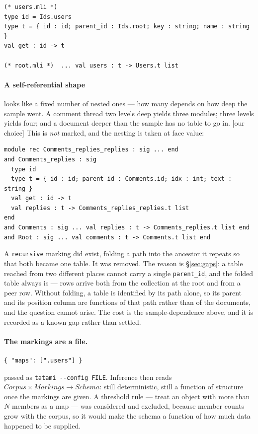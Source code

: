 \documentclass[11pt,a4paper]{article}
\newcommand{\ourcall}{\textcolor{ours}{\textsf{[our choice]}}}
\begin{document}
\begin{lstlisting}[style=ml]
(* users.mli *)
type id = Ids.users
type t = { id : id; parent_id : Ids.root; key : string; name : string }
val get : id -> t

(* root.mli *)  ... val users : t -> Users.t list
\end{lstlisting}

\paragraph{A self-referential shape} looks like a fixed number of nested ones
--- how many depends on how deep the sample went. A comment thread two levels
deep yields three modules; three levels yields four; and a document deeper
than the sample has no table to go in. \ourcall{} This is \emph{not} marked,
and the nesting is taken at face value:

\begin{lstlisting}[style=ml]
module rec Comments_replies_replies : sig ... end
and Comments_replies : sig
  type id
  type t = { id : id; parent_id : Comments.id; idx : int; text : string }
  val get : id -> t
  val replies : t -> Comments_replies_replies.t list
end
and Comments : sig ... val replies : t -> Comments_replies.t list end
and Root : sig ... val comments : t -> Comments.t list end
\end{lstlisting}

A \texttt{recursive} marking did exist, folding a path into the ancestor it
repeats so that both became one table. It was removed. The reason is
\S\ref{sec:gaps}: a table reached from two different places cannot carry a
single \texttt{parent\_id}, and the folded table always is --- rows arrive
both from the collection at the root and from a peer row. Without folding, a
table is identified by its path alone, so its parent and its position column
are functions of that path rather than of the documents, and the question
cannot arise. The cost is the sample-dependence above, and it is recorded as
a known gap rather than settled.

\paragraph{The markings are a file.}

\begin{lstlisting}[style=json]
{ "maps": [".users"] }
\end{lstlisting}

\noindent
passed as \texttt{tatami -{}-config FILE}. Inference then reads
$\mathit{Corpus} \times \mathit{Markings} \rightarrow \mathit{Schema}$: still
deterministic, still a function of structure once the markings are given. A
threshold rule --- treat an object with more than $N$ members as a map --- was
considered and excluded, because member counts grow with the corpus, so it
would make the schema a function of how much data happened to be supplied.
\end{document}
